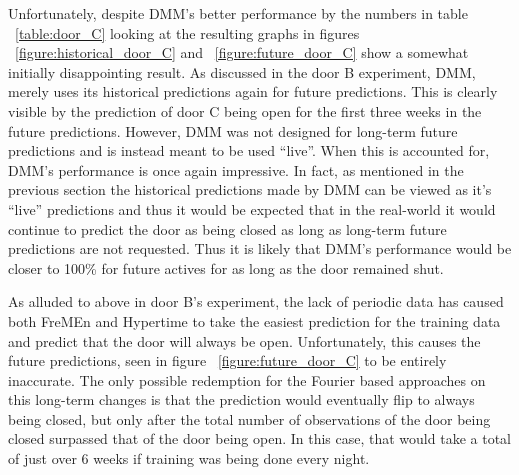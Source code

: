 Unfortunately, despite DMM's better performance by the numbers in table
~\ref{table:door_C}
looking at the resulting graphs in figures
~\ref{figure:historical_door_C} and ~\ref{figure:future_door_C}
show a somewhat
initially disappointing result. As discussed in the door B experiment,
DMM, merely uses its historical predictions again for future
predictions. This is clearly visible by the prediction of door C being open
for the first three weeks in the future predictions. However, DMM was not
designed for long-term future predictions and is instead meant to be used
``live''. When this is accounted for, DMM's performance is once again
impressive. In fact, as mentioned in the previous section the
historical predictions made by DMM can be viewed as it's ``live''
predictions and thus it would be expected that in the real-world it would
continue to predict the door as being closed as long as long-term future
predictions are not requested. Thus it is likely that DMM's
performance would be closer to 100\% for future actives for as long as the door
remained shut. \\

\begin{table}[h!]
  \centering
  \caption{Door C Data Overview}
  \label{table:door_C}
\end{table}

As alluded to above in door B's experiment, the lack of periodic data has
caused both FreMEn and Hypertime to take the easiest prediction for the
training data and predict that the door will always be open. Unfortunately,
this causes the future predictions, seen in figure ~\ref{figure:future_door_C} to be entirely inaccurate. The only possible redemption
for the Fourier based approaches on this long-term changes is that the
prediction would eventually flip to always being closed, but only after the total number of observations of the door being
closed surpassed that of the door being open. In this case, that would take a
total of just over 6 weeks if training was being done every night. \\

